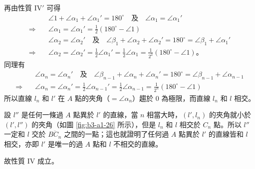 再由性質 $\mathrm{IV}'$ 可得
\begin{align*}
  &\angle 1 + \angle \alpha_1 + \angle \alpha_1' = 180^\circ \quad \text{及} \quad \angle \alpha_1 = \angle \alpha_1' \\
  \Longrightarrow\quad &\angle \alpha_1 = \angle \alpha_1' = \frac{1}{2}(180^\circ - \angle 1) \\[0.5em]
  &\angle \alpha_2 = \angle \alpha_2' \quad \text{及} \quad \angle \beta_1 + \angle \alpha_2 + \angle \alpha_2' = 180^\circ = \angle \beta_1 + \angle \alpha_1' \\
  \Longrightarrow\quad &\angle \alpha_2 = \angle \alpha_2' = \frac{1}{2}\angle \alpha_1' = \frac{1}{2}\angle \alpha_1 = \frac{1}{2^2}(180^\circ - \angle 1) \text{。}
\end{align*}
同理有
\begin{align*}
  &\angle \alpha_n = \angle \alpha_n' \quad \text{及} \quad \angle \beta_{n-1} + \angle \alpha_n + \angle \alpha_n' = 180^\circ = \angle \beta_{n-1} + \angle \alpha_{n-1} \\
  \Longrightarrow\quad &\angle \alpha_n = \angle \alpha_n' = \frac{1}{2}\angle \alpha_{n-1}' = \frac{1}{2}\angle \alpha_{n-1} = \frac{1}{2^n}(180^\circ - \angle 1)
\end{align*}
所以直線 $l_n$ 和 $l'$ 在 $A$ 點的夾角（$= \angle \alpha_n$）趨於 0 為極限，而直線 $l_n$ 和 $l$ 相交。

設 $l''$ 是任何一條過 $A$ 點異於 $l'$ 的直線，當 $n$ 相當大時，$(l', l_n)$ 的夾角就小於 $(l', l'')$ 的夾角（如圖 \ref{fig:b3-a1-26} 所示），但是 $l_n$ 和 $l$ 相交於 $C_n$ 點。所以 $l''$ 一定和 $l$ 交於 $\overline{BC_n}$ 之間的一點；這也就證明了任何過 $A$ 點異於 $l'$ 的直線皆和 $l$ 相交，亦即 $l'$ 是唯一的過 $A$ 點和 $l$ 不相交的直線。

故性質 $\mathrm{IV}$ 成立。
